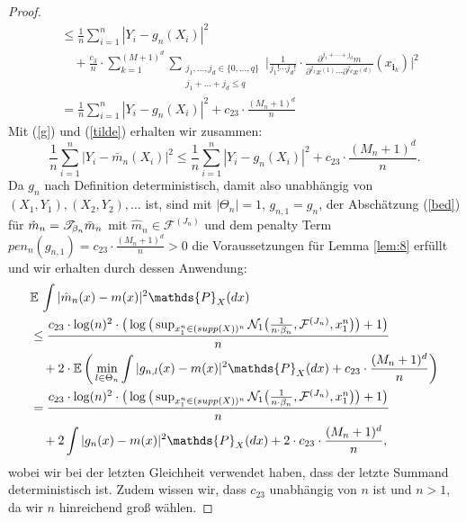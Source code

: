 \begin{proof}
\begin{equation}
\begin{split}
& \leq \frac{1}{n} \sum_{i = 1}^n|Y_i - g_n(X_i)|^2 \\
& \quad + \frac{c_3}{n} \cdot \sum_{k = 1}^{(M + 1)^d} \sum_{\substack{ j_1,\dots,j_d \in \{0,\dots,q\} \\j_1+\dots +j_d \leq q}} \bigg|\frac{1}{j_1! \cdots j_d!} \cdot \frac{\partial^{j_1+\cdots + j_d} m}{\partial^{j_1} x^{(1)}\cdots \partial^{j_d} x^{(d)}}(x_{\mathbf{i}_k})\bigg|^2 \\
& = \frac{1}{n} \sum_{i = 1}^n|Y_i - g_n(X_i)|^2 + c_{23} \cdot \frac{(M_n + 1)^d}{n}
\end{split}
\end{equation}
Mit (\ref{g}) und (\ref{tilde}) erhalten wir zusammen:
\begin{equation}
\label{bed}
\frac{1}{n} \sum_{i = 1}^n|Y_i - \bar{m}_n(X_i)|^2 \leq \frac{1}{n} \sum_{i = 1}^n|Y_i - g_n(X_i)|^2 + c_{23} \cdot \frac{(M_n + 1)^d}{n}.
\end{equation}
Da $g_n$ nach Definition deterministisch, damit also unabhängig von $(X_1, Y_1), (X_2, Y_2),\dots$ ist, sind mit $|\Theta_n| = 1$, $g_{n,1} = g_n$, der Abschätzung (\ref{bed}) für $\hat{m}_n = \mathscr{T}_{\beta_n}\bar{m}_n$ mit $\hat{m}_n \in \mathcal{F}^{(J_n)}$ und dem penalty Term $pen_n(g_{n,1}) = c_{23} \cdot \frac{(M_n + 1)^d}{n} > 0$ die Voraussetzungen für Lemma \ref{lem:8} erfüllt und wir erhalten durch dessen Anwendung:
\begin{equation*}
\begin{split}
& \E \int |\hat{m}_n(x) - m(x)|^2 \mathds{P}_X(dx) \\
& \leq \frac{c_{23} \cdot \log(n)^2 \cdot \big(\log\big(\sup_{x_1^n \in (supp(X))^n}\mathcal{N}_1\big(\frac{1}{n \cdot \beta_n},\mathcal{F}^{(J_n)},x_1^n\big)\big) + 1\big)}{n} \\
& \quad + 2 \cdot \E\bigg(\min_{l \in \Theta_n} \int |g_{n,l}(x) - m(x)|^2 \mathds{P}_X(dx) + c_{23} \cdot \frac{(M_n + 1)^d}{n}\bigg) \\
& = \frac{c_{23} \cdot \log(n)^2 \cdot \big(\log\big(\sup_{x_1^n \in (supp(X))^n}\mathcal{N}_1\big(\frac{1}{n \cdot \beta_n},\mathcal{F}^{(J_n)},x_1^n\big)\big) + 1\big)}{n} \\
& \quad + 2 \int |g_{n}(x) - m(x)|^2 \mathds{P}_X(dx) + 2 \cdot c_{23} \cdot \frac{(M_n + 1)^d}{n},
\end{split}
\end{equation*}
wobei wir bei der letzten Gleichheit verwendet haben, dass der letzte Summand deterministisch ist. Zudem wissen wir, dass $c_{23}$ unabhängig von $n$ ist und $n > 1$, da wir $n$ hinreichend groß wählen.

\end{proof}
